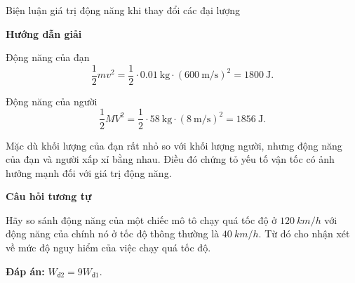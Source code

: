 \begin{dang}{Biện luận giá trị động năng khi thay đổi các đại lượng}
	{	\begin{center}
			\textbf{Hướng dẫn giải}
		\end{center}
		
		Động năng của đạn
		\begin{equation*}
			\dfrac{1}{2}mv^2=\dfrac{1}{2}\cdot\SI{0.01}{\kilogram}\cdot(\SI{600}{\meter/\second})^2 =1800\ \text{J}.
		\end{equation*}	
		
		Động năng của người 
		\begin{equation*}
			\dfrac{1}{2}MV^2 =\dfrac{1}{2}\cdot\SI{58}{\kilogram}\cdot(\SI{8}{\meter/\second})^2=1856\ \text{J}.
		\end{equation*}
		
		Mặc dù khối lượng của đạn rất nhỏ so với khối lượng người, nhưng động năng của đạn và người xấp xỉ bằng nhau. Điều đó chứng tỏ yếu tố vận tốc có ảnh hưởng mạnh đối với giá trị động năng.
		
		\begin{center}
			\textbf{Câu hỏi tương tự}
		\end{center}
		
		Hãy so sánh động năng của một chiếc mô tô chạy quá tốc độ ở $\SI{120}{km/h}$ với động năng của chính nó ở tốc độ thông thường là $\SI{40}{km/h}$. Từ đó cho nhận xét về mức độ nguy hiểm của việc chạy quá tốc độ.
		
		\textbf{Đáp án:} $W_\text{đ2} = 9W_\text{đ1}$.
	}
		
		

\end{dang}
